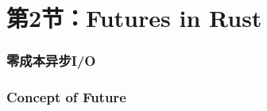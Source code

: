 \section{第2节：Futures in Rust} %
% 
% 
\begin{frame}[fragile]
    \frametitle{零成本异步I/O}
% 
% 
% 
% 
% 
% 
% 
\end{frame}
\begin{frame}[fragile]
    \frametitle{Concept of Future}
% 
% 
% 
% 
% 
% 
\end{frame}

